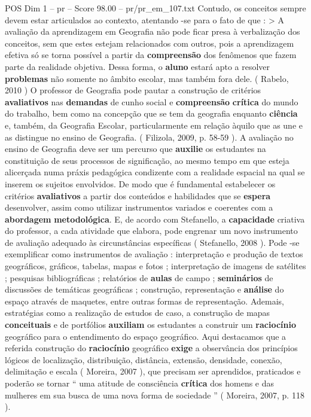 \begin{textsample}{POS Dim 1 – pr – Score 98.00 – pr/pr\_em\_107.txt}
Contudo, os conceitos sempre devem estar articulados ao contexto, atentando -se para o fato de que : > A avaliação da aprendizagem em Geografia não pode ficar presa à verbalização dos conceitos, sem que estes estejam relacionados com outros, pois a aprendizagem efetiva só se torna possível a partir da \textbf{compreensão} dos fenômenos que fazem parte da realidade objetiva.
Dessa forma, o \textbf{aluno} estará apto a resolver \textbf{problemas} não somente no âmbito escolar, mas também fora dele. ( Rabelo, 2010 ) O professor de Geografia pode pautar a construção de critérios \textbf{avaliativos} nas \textbf{demandas} de cunho social e \textbf{compreensão} \textbf{crítica} do mundo do trabalho, bem como na concepção que se tem da geografia enquanto \textbf{ciência} e, também, da Geografia Escolar, particularmente em relação àquilo que as une e as distingue no ensino de Geografia. ( Filizola, 2009, p. 58-59 ).
A avaliação no ensino de Geografia deve ser um percurso que \textbf{auxilie} os estudantes na constituição de seus processos de significação, ao mesmo tempo em que esteja alicerçada numa práxis pedagógica condizente com a realidade espacial na qual se inserem os sujeitos envolvidos.
De modo que é fundamental estabelecer os critérios \textbf{avaliativos} a partir dos conteúdos e habilidades que se \textbf{espera} desenvolver, assim como utilizar instrumentos variados e coerentes com a \textbf{abordagem} \textbf{metodológica}.
E, de acordo com Stefanello, a \textbf{capacidade} criativa do professor, a cada atividade que elabora, pode engrenar um novo instrumento de avaliação adequado às circunstâncias específicas ( Stefanello, 2008 ).
Pode -se exemplificar como instrumentos de avaliação : interpretação e produção de textos geográficos, gráficos, tabelas, mapas e fotos ; interpretação de imagens de satélites ; pesquisas bibliográficas ; relatórios de \textbf{aulas} de campo ; \textbf{seminários} de discussões de temáticas geográficas ; construção, representação e \textbf{análise} do espaço através de maquetes, entre outras formas de representação.
Ademais, estratégias como a realização de estudos de caso, a construção de mapas \textbf{conceituais} e de portfólios \textbf{auxiliam} os estudantes a construir um \textbf{raciocínio} geográfico para o entendimento do espaço geográfico.
Aqui destacamos que a referida construção do \textbf{raciocínio} geográfico \textbf{exige} a observância dos princípios lógicos de localização, distribuição, distância, extensão, densidade, conexão, delimitação e escala ( Moreira, 2007 ), que precisam ser aprendidos, praticados e poderão se tornar “ uma atitude de consciência \textbf{crítica} dos homens e das mulheres em sua busca de uma nova forma de sociedade ” ( Moreira, 2007, p. 118 ).

\end{textsample}
